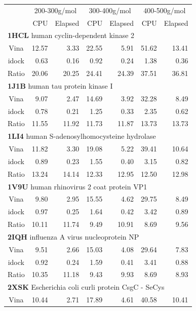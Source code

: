 \documentclass[10pt]{article}
\begin{document}
\pagebreak
\begin{table}
\centering
\begin{tabular*}
{\linewidth}
{@{\extracolsep{\fill}}crrrrrr}
\toprule
& \multicolumn{2}{c}{200-300g/mol} & \multicolumn{2}{c}{300-400g/mol} & \multicolumn{2}{c}{400-500g/mol}\\
& CPU & Elapsed & CPU & Elapsed & CPU & Elapsed\\
\midrule
\multicolumn{7}{l}{\textbf{1HCL} human cyclin-dependent kinase 2}\\
Vina  & 12.57 &  3.33 & 22.55 &  5.91 & 51.62 & 13.41\\
idock &  0.63 &  0.16 &  0.92 &  0.24 &  1.38 &  0.36\\
Ratio & 20.06 & 20.25 & 24.41 & 24.39 & 37.51 & 36.81\\
\multicolumn{7}{l}{\textbf{1J1B} human tau protein kinase I}\\
Vina  &  9.07 &  2.47 & 14.69 &  3.92 & 32.28 &  8.49\\
idock &  0.78 &  0.21 &  1.25 &  0.33 &  2.35 &  0.62\\
Ratio & 11.55 & 11.92 & 11.73 & 11.87 & 13.73 & 13.73\\
\multicolumn{7}{l}{\textbf{1LI4} human S-adenosylhomocysteine hydrolase}\\
Vina  & 11.82 &  3.30 & 19.08 &  5.22 & 39.41 & 10.64\\
idock &  0.89 &  0.23 &  1.55 &  0.40 &  3.15 &  0.82\\
Ratio & 13.24 & 14.14 & 12.33 & 12.95 & 12.50 & 12.98\\
\multicolumn{7}{l}{\textbf{1V9U} human rhinovirus 2 coat protein VP1}\\
Vina  &  9.80 &  2.95 & 15.55 &  4.62 & 29.75 &  8.49\\
idock &  0.97 &  0.25 &  1.64 &  0.42 &  3.42 &  0.89\\
Ratio & 10.11 & 11.74 &  9.49 & 10.91 &  8.69 &  9.56\\
\multicolumn{7}{l}{\textbf{2IQH} influenza A virus nucleoprotein NP}\\
Vina  &  9.51 &  2.66 & 15.03 &  4.08 & 29.64 &  7.83\\
idock &  0.92 &  0.24 &  1.59 &  0.41 &  3.41 &  0.88\\
Ratio & 10.35 & 11.18 &  9.43 &  9.93 &  8.69 &  8.93\\
\multicolumn{7}{l}{\textbf{2XSK} Escherichia coli curli protein CsgC - SeCys}\\
Vina  & 10.44 &  2.71 & 17.89 &  4.61 & 40.58 & 10.41\\

\end{tabular*}
\end{table}
\end{document}
